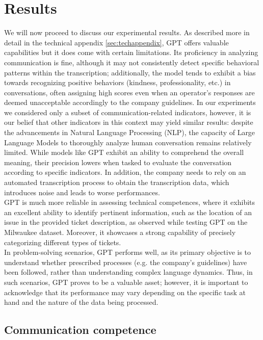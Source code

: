 \chapter{Results}
\label{sec:results}

We will now proceed to discuss our experimental results. As described more in detail in the technical appendix \ref{sec:techappendix}, GPT offers valuable capabilities but it does come with certain limitations. Its proficiency in analyzing communication is fine, although it may not consistently detect specific behavioral patterns within the transcription; additionally, the model tends to exhibit a bias towards recognizing positive behaviors (kindness, professionality, etc.) in conversations, often assigning high scores even when an operator's responses are deemed unacceptable accordingly to the company guidelines. In our experiments we considered only a subset of communication-related indicators, however, it is our belief that other indicators in this context may yield similar results: despite the advancements in Natural Language Processing (NLP), the capacity of Large Language Models to thoroughly analyze human conversation remains relatively limited. While models like GPT exhibit an ability to comprehend the overall meaning, their precision lowers when tasked to evaluate the conversation according to specific indicators. In addition, the company needs to rely on an automated transcription process to obtain the transcription data, which introduces noise and leads to worse performances. \\

GPT is much more reliable in assessing technical competences, where it exhibits an excellent ability to identify pertinent information, such as the location of an issue in the provided ticket description, as observed while testing GPT on the Milwaukee dataset. Moreover, it showcases a strong capability of precisely categorizing different types of tickets. \\

In problem-solving scenarios, GPT performs well, as its primary objective is to understand whether prescribed processes (e.g. the company's guidelines) have been followed, rather than understanding complex language dynamics. Thus, in such scenarios, GPT proves to be a valuable asset; however, it is important to acknowledge that its performance may vary depending on the specific task at hand and the nature of the data being processed.

\section{Communication competence}

